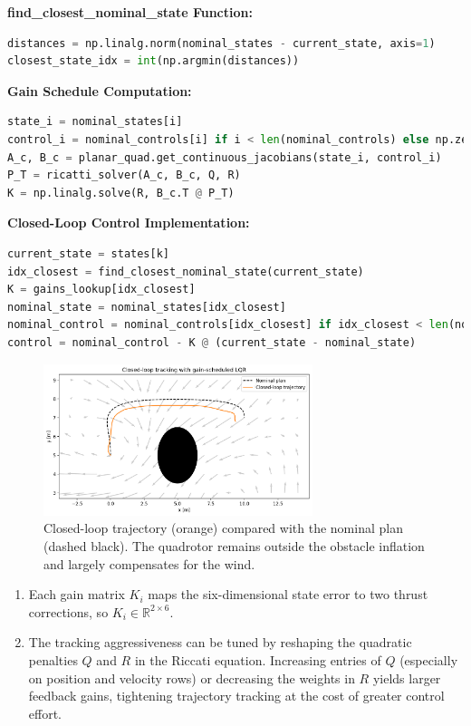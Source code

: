 \documentclass [11pt]{article}
\begin{document}
\begin{enumerate}[label=(\roman*)]
        \textbf{find\_closest\_nominal\_state Function:}
\begin{lstlisting}[language=Python]
distances = np.linalg.norm(nominal_states - current_state, axis=1)
closest_state_idx = int(np.argmin(distances))
\end{lstlisting}

        \textbf{Gain Schedule Computation:}
\begin{lstlisting}[language=Python]
state_i = nominal_states[i]
control_i = nominal_controls[i] if i < len(nominal_controls) else np.zeros(planar_quad.u_dim)
A_c, B_c = planar_quad.get_continuous_jacobians(state_i, control_i)
P_T = ricatti_solver(A_c, B_c, Q, R)
K = np.linalg.solve(R, B_c.T @ P_T)
\end{lstlisting}

        \textbf{Closed-Loop Control Implementation:}
\begin{lstlisting}[language=Python]
current_state = states[k]
idx_closest = find_closest_nominal_state(current_state)
K = gains_lookup[idx_closest]
nominal_state = nominal_states[idx_closest]
nominal_control = nominal_controls[idx_closest] if idx_closest < len(nominal_controls) else np.zeros(planar_quad.u_dim)
control = nominal_control - K @ (current_state - nominal_state)
\end{lstlisting}

        \begin{figure}[H]
            \centering
            \includegraphics[width=0.7\textwidth]{figs/p3_closed_loop.png}
            \caption{Closed-loop trajectory (orange) compared with the nominal plan (dashed black). The quadrotor remains outside the obstacle inflation and largely compensates for the wind.}
            \label{fig:p3_closed_loop}
        \end{figure}

        \begin{enumerate}[label=(\alph*)]
            \item Each gain matrix $K_i$ maps the six-dimensional state error to two thrust corrections, so $K_i \in \mathbb{R}^{2 \times 6}$.
            \item The tracking aggressiveness can be tuned by reshaping the quadratic penalties $Q$ and $R$ in the Riccati equation. Increasing entries of $Q$ (especially on position and velocity rows) or decreasing the weights in $R$ yields larger feedback gains, tightening trajectory tracking at the cost of greater control effort.
        \end{enumerate}
    \end{enumerate}
\end{document}
